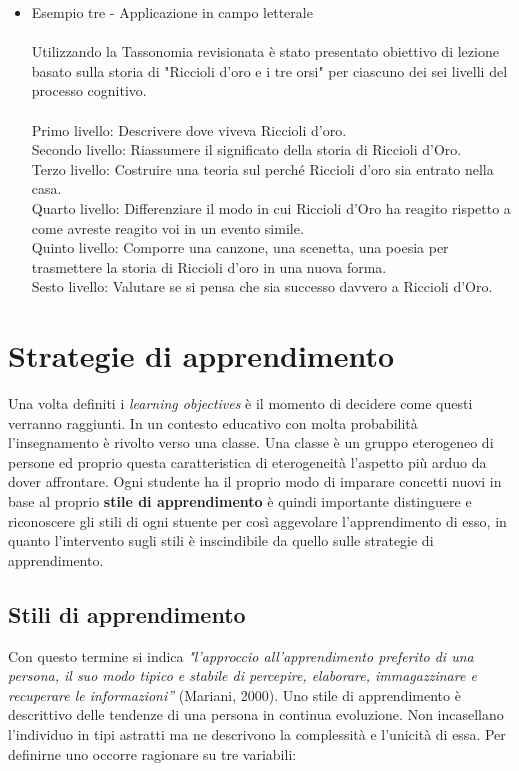 \begin{itemize}
\item Esempio tre - Applicazione in campo letterale\\
\\
Utilizzando la Tassonomia revisionata è stato presentato obiettivo di lezione basato sulla storia di "Riccioli d'oro e i tre orsi" per ciascuno dei sei livelli del processo cognitivo.\\
\\
Primo livello: Descrivere dove viveva Riccioli d'oro.\\
Secondo livello: Riassumere il significato della storia di Riccioli d'Oro.\\
Terzo livello: Costruire una teoria sul perché Riccioli d'oro sia entrato nella casa.\\
Quarto livello: Differenziare il modo in cui Riccioli d'Oro ha reagito rispetto a come avreste reagito voi in un evento simile.\\
Quinto livello: Comporre una canzone, una scenetta, una poesia per trasmettere la storia di Riccioli d'oro in una nuova forma.\\
Sesto livello: Valutare se si pensa che sia successo davvero a Riccioli d'Oro.
\end{itemize}
\section{Strategie di apprendimento}
\label{sec:problem}

Una volta definiti i \textit{learning objectives} è il momento di decidere come questi verranno raggiunti. In un contesto educativo con molta probabilità l'insegnamento è rivolto verso una classe. Una classe è un gruppo eterogeneo di persone ed proprio questa caratteristica di eterogeneità l'aspetto più arduo da dover affrontare. Ogni studente ha il proprio modo di imparare concetti nuovi in base al proprio \textbf{stile di apprendimento} è quindi importante distinguere e riconoscere gli stili di ogni stuente per così aggevolare l'apprendimento di esso, in quanto l'intervento sugli stili è inscindibile da quello sulle strategie di apprendimento.

\subsection{Stili di apprendimento}
Con questo termine si indica \textit{"l'approccio all’apprendimento preferito di una persona, il suo modo tipico e stabile di percepire, elaborare, immagazzinare e recuperare le informazioni”} (Mariani, 2000).
Uno stile di apprendimento è descrittivo delle tendenze di una persona in continua evoluzione. Non incasellano l'individuo in tipi astratti ma ne descrivono la complessità e l'unicità di essa. Per definirne uno occorre ragionare su tre variabili:

